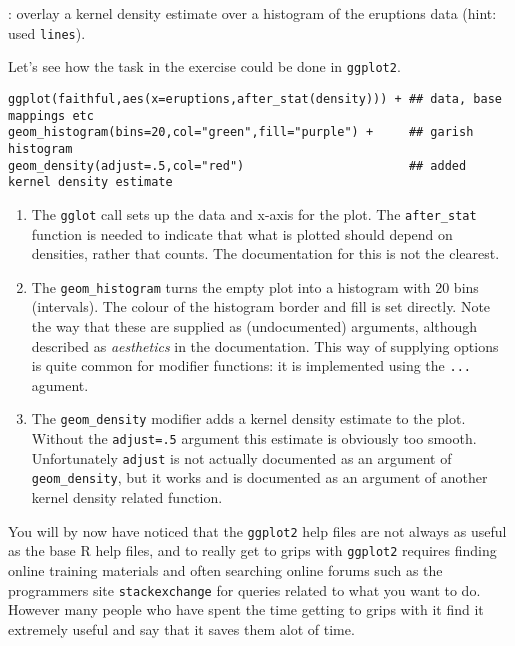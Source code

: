 \documentclass[10pt] {article}
\newcommand{\eps}[3]
{{\begin{center}
 \rotatebox{#1}{\scalebox{#2}{\texttt{[image: \#3]}}}
 \end{center}}
}
\theoremstyle{definition}
\begin{document}
: overlay a kernel density estimate over a histogram of the eruptions data (hint: used {\tt lines}).

Let's see how the task in the exercise could be done in {\tt ggplot2}.
\begin{lstlisting}
ggplot(faithful,aes(x=eruptions,after_stat(density))) + ## data, base mappings etc
geom_histogram(bins=20,col="green",fill="purple") +     ## garish histogram
geom_density(adjust=.5,col="red")                       ## added kernel density estimate
\end{lstlisting}
\eps{0}{.6}{geyser-gg.eps}
\begin{enumerate}
\item The \lstinline+gglot+ call sets up the data and x-axis for the plot. The \lstinline+after_stat+ function is needed to indicate that what is plotted should depend on densities, rather that counts. The documentation for this is not the clearest.
\item The \lstinline+geom_histogram+ turns the empty plot into a histogram with 20 bins (intervals). The colour of the histogram border and fill is set directly. Note the way that these are supplied as (undocumented) arguments, although described as {\em  aesthetics} in the documentation. This way of supplying options is quite common for modifier functions: it is implemented using the \verb+...+ agument.
\item The \lstinline+geom_density+ modifier adds a kernel density estimate to the plot. Without the 
\lstinline+adjust=.5+ argument this estimate is obviously too smooth. Unfortunately {\tt adjust} is not actually documented as an argument of \lstinline+geom_density+, but it works and is documented as an argument of another kernel density related function.    
\end{enumerate}
You will by now have noticed that the {\tt ggplot2} help files are not always as useful as the base R help files, and to really get to grips with {\tt ggplot2} requires finding online training materials and often searching online forums such as the programmers site {\tt stackexchange} for queries related to what you want to do. However many people who have spent the time getting to grips with it find it extremely useful and say that it saves them alot of time. 
\end{document}

